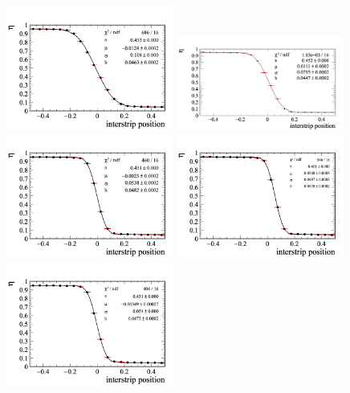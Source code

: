  
 
\begin{figure}[tbph]
\begin{center}
\includegraphics[width = 0.49\textwidth]{figures/eta/eta_fit_10.png} 
\includegraphics[width = 0.49\textwidth]{figures/eta/eta_fit_neg10.png}
\includegraphics[width = 0.49\textwidth]{figures/eta/eta_fit_2.png} 
\includegraphics[width = 0.49\textwidth]{figures/eta/eta_fit_neg2.png} 
\includegraphics[width = 0.49\textwidth]{figures/eta/eta_fit_0.png} 


\end{center}
\end{figure}
